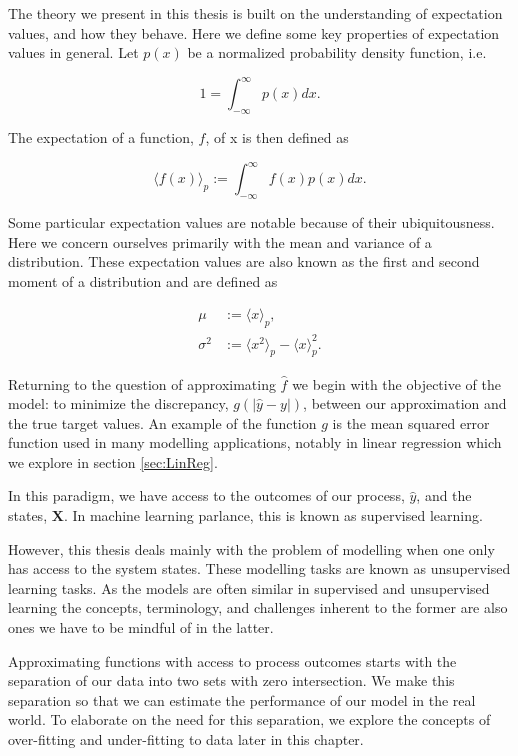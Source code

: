 The theory we present in this thesis is built on the understanding of expectation values, and how they behave.  Here we define some key properties of expectation values in general. Let $p(x)$ be a normalized probability density function, i.e.

\begin{equation}
1 = \int_{-\infty}^\infty p(x) dx.
\end{equation}

\noindent The expectation of a function, $f$, of x is then defined as 

\begin{equation}\label{eq:expect}
\langle f(x) \rangle_p :=\int_{-\infty}^\infty f(x) p(x) dx.
\end{equation}

\noindent Some particular expectation values are notable because of their ubiquitousness. Here we concern ourselves primarily with the mean and variance of a distribution. These expectation values are also known as the first and second moment of a distribution and are defined as

\begin{align}
\mu &:= \langle x \rangle_p, \\
\sigma^2 &:= \langle x^2 \rangle_p  - \langle x\rangle_p^2.
\end{align}

\noindent Returning to the question of approximating $\hat{f}$ we begin with the objective of the model: to minimize the discrepancy, $g(|\hat{y} - y|)$, between our approximation and the true target values. An example of the function $g$ is the mean squared error function used in many modelling applications, notably in linear regression which we explore in section \ref{sec:LinReg}.

In this paradigm, we have access to the outcomes of our process, $\hat{y}$, and the states, $\boldsymbol{X}$. In machine learning parlance, this is known as supervised learning. 

However, this thesis deals mainly with the problem of modelling when one only has access to the system states. These modelling tasks are known as unsupervised learning tasks. As the models are often similar in supervised and unsupervised learning the concepts, terminology, and challenges inherent to the former are also ones we have to be mindful of in the latter.

Approximating functions with access to process outcomes starts with the separation of our data into two sets with zero intersection. We make this separation so that we can estimate the performance of our model in the real world. To elaborate on the need for this separation, we explore the concepts of over-fitting and under-fitting to data later in this chapter.